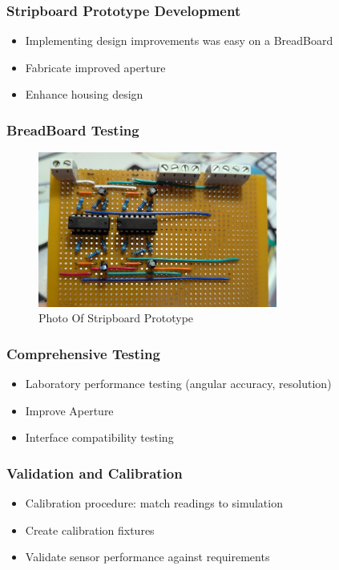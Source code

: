 \subsubsection*{Stripboard Prototype Development}
\begin{itemize}
  \item Implementing design improvements was easy on a BreadBoard
  \item Fabricate improved aperture
  \item Enhance housing design
\end{itemize}


\subsubsection*{BreadBoard Testing}
%
\begin{figure}[htbp] %
  \centering
  \includegraphics[width=0.7\textwidth]{chapters/methodology/prototype/StripboardPhoto.jpg}
  \caption{Photo Of Stripboard Prototype}
  \label{fig:StripboardPhoto}
\end{figure}

\subsubsection*{Comprehensive Testing}
\begin{itemize}
  \item Laboratory performance testing (angular accuracy, resolution)
  \item Improve Aperture
  \item Interface compatibility testing
\end{itemize}

\subsubsection*{Validation and Calibration}
\begin{itemize}
  \item Calibration procedure: match readings to simulation
  \item Create calibration fixtures
  \item Validate sensor performance against requirements
\end{itemize}






